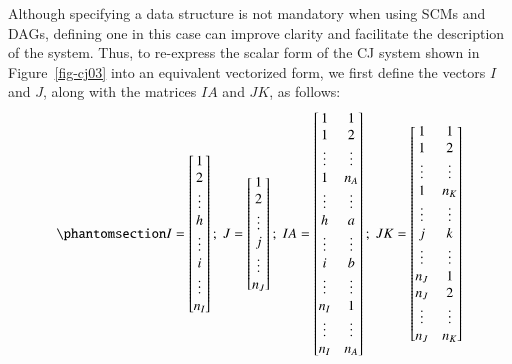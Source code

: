 \documentclass[
  authoryear,
  review,
  1p]{elsarticle}
\begin{document}
Although specifying a data structure is not mandatory when using SCMs
and DAGs, defining one in this case can improve clarity and facilitate
the description of the system. Thus, to re-express the scalar form of
the CJ system shown in Figure~\ref{fig-cj03} into an equivalent
vectorized form, we first define the vectors \(I\) and \(J\), along with
the matrices \(IA\) and \(JK\), as follows:
\begin{equation}\phantomsection\label{eq-mat11}{
I = \begin{bmatrix}
1 \\
2 \\
\vdots \\
h \\
\vdots \\
i \\
\vdots \\
n_{I}
\end{bmatrix} ; \;
J = \begin{bmatrix}
1 \\
2 \\
\vdots \\
j \\
\vdots \\
n_{J}
\end{bmatrix} ; \;
IA = \begin{bmatrix}
1 & 1 \\
1 & 2 \\
\vdots & \vdots \\
1 & n_{A} \\
\vdots & \vdots \\
h & a \\
\vdots & \vdots \\
i & b \\
\vdots & \vdots \\
n_{I} & 1 \\
\vdots & \vdots \\
n_{I} & n_{A} \\
\end{bmatrix} ; \;
JK = \begin{bmatrix}
1 & 1 \\
1 & 2 \\
\vdots & \vdots \\
1 & n_{K} \\
\vdots & \vdots \\
j & k \\
\vdots & \vdots \\
n_{J} & 1 \\
n_{J} & 2 \\
\vdots & \vdots \\
n_{J} & n_{K} \\
\end{bmatrix}
}\end{equation}
\end{document}
